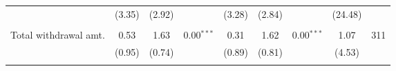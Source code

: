 \begin{table}[htbp]
{\begin{threeparttable}
\begin{tabular}{l*{8}{c}}
          &   (3.35)&   (2.92)&         &   (3.28)&   (2.84)&         &  (24.48)&         \\
          &         &         &         &         &         &         &         &         \\
Total withdrawal amt.&     0.53&     1.63&0.00$^{***}$&     0.31&     1.62&0.00$^{***}$&     1.07&      311\\
          &   (0.95)&   (0.74)&         &   (0.89)&   (0.81)&         &   (4.53)&         \\
          &         &         &         &         &         &         &         &         \\
\bottomrule \end{tabular} \begin{tablenotes}[flushleft] \footnotesize \item  \end{tablenotes} \end{threeparttable} } \end{table}
